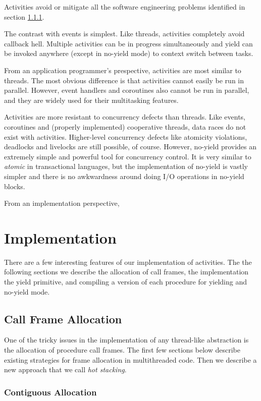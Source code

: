 \documentclass[10pt,preprint]{sigplanconf}
\begin{document}
Activities avoid or mitigate all the software engineering problems identified in section \ref{}.

The contrast with events is simplest.
Like threads, activities completely avoid callback hell.
Multiple activities can be in progress simultaneously and yield can be invoked anywhere (except in no-yield mode) to context switch between tasks.

From an application programmer's prespective, activities are most similar to threads.
The most obvious difference is that activities cannot easily be run in parallel.
However, event handlers and coroutines also cannot be run in parallel, and they are widely used for their multitasking features.

Activities are more resistant to concurrency defects than threads.
Like events, coroutines and (properly implemented) cooperative threads, data races do not exist with activities.
Higher-level concurrency defects like atomicity violations, deadlocks and livelocks are still possible, of course.
However, no-yield provides an extremely simple and powerful tool for concurrency control.
It is very similar to \emph{atomic} in transactional languages, but the implementation of no-yield is vastly simpler and there is no awkwardness around doing I/O operations in no-yield blocks.

From an implementation perspective, 

\section{Implementation}

There are a few interesting features of our implementation of activities.
The the following sections we describe the allocation of call frames, the implementation the yield primitive, and compiling a version of each procedure for yielding and no-yield mode.

\subsection{Call Frame Allocation}

One of the tricky issues in the implementation of any thread-like abstraction is the allocation of procedure call frames.
The first few sections below describe existing strategies for frame allocation in multithreaded code.
Then we describe a new approach that we call \emph{hot stacking}.

\subsubsection{Contiguous Allocation}
\end{document}
